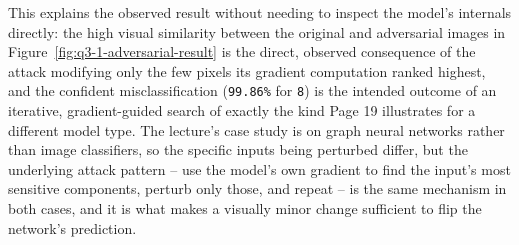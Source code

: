 This explains the observed result without needing to inspect the model's internals directly: the high visual similarity between the original and adversarial images in Figure~\ref{fig:q3-1-adversarial-result} is the direct, observed consequence of the attack modifying only the few pixels its gradient computation ranked highest, and the confident misclassification (\texttt{99.86\%} for \texttt{8}) is the intended outcome of an iterative, gradient-guided search of exactly the kind Page 19 illustrates for a different model type. The lecture's case study is on graph neural networks rather than image classifiers, so the specific inputs being perturbed differ, but the underlying attack pattern -- use the model's own gradient to find the input's most sensitive components, perturb only those, and repeat -- is the same mechanism in both cases, and it is what makes a visually minor change sufficient to flip the network's prediction.

